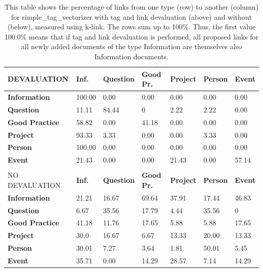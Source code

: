 \begin{table}
\begin{tabular}{| l | l | l | l | l | l | l | }
\hline
DEVALUATION & {\bf Inf. }& {\bf Question }& {\bf Good Pr.} & {\bf Project }&{\bf Person }& {\bf Event}  \\
\hline
{\bf Information} & 100.00 &  0.00 &  0.00 &  0.00  & 0.00 & 0.00 \\
{\bf Question} & 11.11 &  84.44  & 0 & 2.22  & 2.22 & 0.00 \\
{\bf Good Practice} & 58.82 &  0.00  &  41.18  &  0.00  & 0.00 & 0.00 \\
{\bf Project }& 93.33 &  3.33  &  0.00  & 0.00 & 3.33 & 0.00 \\
{\bf Person} &  100.00 &  0.00 &  0.00 &  0.00  & 0.00 & 0.00 \\
{\bf Event }& 21.43 &  0.00  &  0.00 &  21.43  & 0.00 & 57.14 \\
\hline
\\
\hline
NO DEVALUATION & {\bf Inf. }& {\bf Question }& {\bf Good Pr.} & {\bf Project }&{\bf Person }& {\bf Event} \\
\hline
{\bf Information} &  21.21 & 16.67 & 69.64 & 37.91 & 17.44 & 46.83 \\
{\bf Question} & 6.67 & 35.56 &17.79 & 4.44 & 35.56 & 0 \\
{\bf Good Practice} & 41.18 & 11.76 & 17.65 & 5.88 & 5.88 & 17.65 \\
{\bf Project } & 30.0 & 16.67 & 6.67 & 13.33 & 20.00 & 13.33 \\
{\bf Person} & 30.01 & 7.27 & 3.64 & 1.81 & 50.01 & 5.45 \\
{\bf Event }& 35.71 & 0.00 & 14.29 & 28.57 & 7.14 & 14.29 \\
\hline
\end{tabular}

\caption{This table shows the percentage of links from one type (row) to another (column) for simple\_tag\_vectorizer with tag and link devaluation (above) and without (below), measured using k-link.  The rows sum up to 100\%. Thus, the first value 100.0\% means that if tag and link devaluation is performed, all proposed links for all newly added documents of the type Information are themselves also Information documents.}
\label{bayes_table2}
\end{table}

